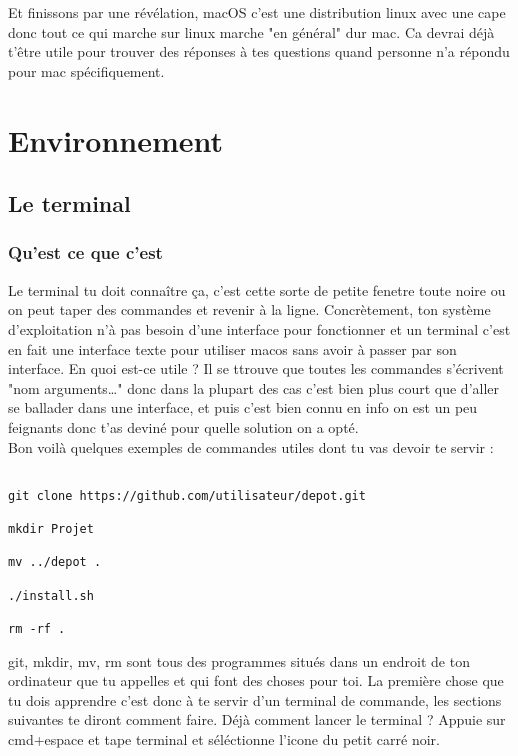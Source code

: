 \documentclass[10pt,a4paper]{book}
\begin{document}
Et finissons par une révélation, macOS c'est une distribution linux avec une cape donc tout ce qui marche sur linux marche "en général" dur mac. Ca devrai déjà t'être utile pour trouver des réponses à tes questions quand personne n'a répondu pour mac spécifiquement.


\chapter{Environnement}

\section{Le terminal}

\subsection{Qu'est ce que c'est}
Le terminal tu doit connaître ça, c'est cette sorte de petite fenetre toute noire ou on peut taper des commandes et revenir à la ligne. Concrètement, ton système d'exploitation n'à pas besoin d'une interface pour fonctionner et un terminal c'est en fait une interface texte pour utiliser macos sans avoir à passer par son interface. En quoi est-ce utile ? Il se ttrouve que toutes les commandes s'écrivent "nom arguments\ldots" donc dans la plupart des cas c'est bien plus court que d'aller se ballader dans une interface, et puis c'est bien connu en info  on est un peu feignants donc t'as deviné pour quelle solution on a opté. 
\\
Bon voilà quelques exemples de commandes utiles dont tu vas devoir te servir :

\begin{lstlisting}

git clone https://github.com/utilisateur/depot.git

mkdir Projet

mv ../depot .

./install.sh

rm -rf .

\end{lstlisting}

git, mkdir, mv, rm sont tous des programmes situés dans un endroit de ton ordinateur que tu appelles et qui font des choses pour toi. La première chose que tu dois apprendre c'est donc à te servir d'un terminal de commande, les sections suivantes te diront comment faire.
Déjà comment lancer le terminal ? Appuie sur cmd+espace et tape terminal et séléctionne l'icone du petit carré noir.
\end{document}
